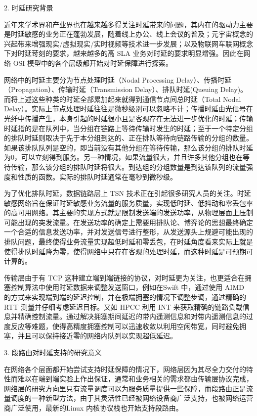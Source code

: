2. 时延研究背景

近年来学术界和产业界也在越来越多得关注时延带来的问题，其内在的驱动力主要是时延敏感的业务正在蓬勃发展，随着线上办公、线上会议的普及；元宇宙概念的兴起带来增强现实/虚拟现实/实时视频等技术进一步发展；以及物联网车联网概念下对时延苛刻的要求，越来越多的高 \gls*{SLA} 业务对时延的要求明显增强。因此在网络 \gls*{OSI} 模型中的各个层级都开始对时延保障进行探索。

网络中的时延主要分为节点处理时延（Nodal Processing Delay）、传播时延（Propagation）、传输时延（Transmission Delay）、排队时延(Queuing Delay)。而将上述这些种类的时延全部累加起来就得到通信节点间总时延（Total Nodal Delay）。实际上节点处理时延往往是微秒级别可以忽略不计；传播时延由光信号在光纤中传播产生，本身引起的时延很小且是客观存在无法进一步优化的时延；传输时延指的是在队列中，当分组在链路上等待传输时发生的时延；至于一个特定分组的排队时延则取决于先于本分组到达的、正在排队等待向链路传输的分组的数量。如果该排队队列是空的，即当前没有其他分组在等待传输，那么该分组的排队时延为0，可以立刻得到服务。另一种情况，如果流量很大，并且许多其他分组也在等待传输，那么该分组的排队时延将很大。到达组的分组数量是到达该队列的流量强度和性质的函数。实际的排队时延通常在毫秒到微秒级。

为了优化排队时延，数据链路层上 \gls*{TSN} 技术正在引起很多研究人员的关注。时延敏感网络旨在保证时延敏感业务流量的服务质量，实现低时延、低抖动和零丢包率的高可用网络。其主要的实现方式就是限制发送端的发送功率，从物理层面上压制可能出现的突发流量。在发送功率的确定上需要用排队论、博弈论的思想最终确定一个合适的信息发送功率，并对发送信号进行整形，从发送源头上规避可能出现的排队问题，最终使得业务流量实现超低时延和零丢包，在时延角度看来实际上就是使得排队时延降为零，使得网络中只存在客观的处理时延，而这种时延是可预期可计算的。

传输层由于有 \gls*{TCP} 这种建立端到端链接的协议，对时延更为关注，也更适合在拥塞控制算法中使用时延数据来调整发送窗口，例如在Swift \cite{SWIFT} 中，通过使用 \gls*{AIMD} 的方式来实现端到端的延迟控制，并在极端拥塞的情况下调整步调，通过精确的 \gls*{RTT} 测量并仔细考虑延迟目标。又如 \gls*{HPCC} \cite{HPCC} 利用 \gls*{INT} 来获取精确的链路负载信息并精确控制流量。通过解决拥塞期间延迟的带内遥测信息和对带内遥测信息的过度反应等难题，使得高精度拥塞控制可以迅速收敛以利用空闲带宽，同时避免拥塞，并且可以保持接近零的网络内队列以实现超低延迟。

3. 段路由对时延支持的研究意义

在网络各个层面都开始尝试支持时延保障的情况下，网络层因为其尽全力交付的特性而难以在端到端实验上作出保证，通常和业务相关的需求都由传输层协议完成，网络层的研究方向里只有流量调度可以为服务质量提供一些保障，而段路由正是流量调度的一种新型方法，由于其灵活性已经被网络设备商广泛支持，也被网络运营商广泛使用，最新的Linux \cite{LINUXSRv6} 内核协议栈也开始支持段路由。

